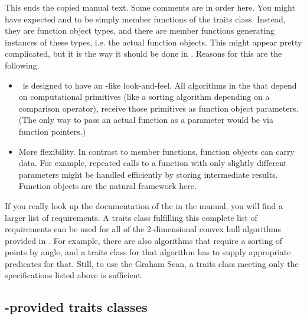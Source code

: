 This ends the copied manual text. 
Some comments are in order here. You might have expected 
and  to be simply member functions of the traits class.
Instead, they are function object types, and there are member 
functions generating instances of these types, i.e. the actual function 
objects. This might appear pretty complicated, but it is the way it should
be done in \cgal. Reasons for this are the following.
\begin{itemize}
\item \cgal\ is designed to have an \stl-like look-and-feel. 
      All algorithms in the \stl that depend on computational
      primitives (like a sorting algorithm depending on a comparison operator),
      receive those primitives as function object parameters. (The only way to
      pass an actual function as a parameter would be via function pointers.)
\item More flexibility. In contrast to member functions, function objects
      can carry data. For example, repeated calls to a function with only
      slightly different parameters might be handled efficiently by storing
      intermediate results. Function objects are the natural framework here.
\end{itemize}

If you really look up the documentation of the 
 in the manual, you will find a larger
list of requirements. 
A traits class fulfilling this complete list of requirements can be used
for all of the 2-dimensional convex hull algorithms provided in \cgal. 
For example, there are also
algorithms that require a sorting of points by angle, and a traits class for
that algorithm has to supply appropriate predicates for that. Still, to use
the Graham Scan, a traits class meeting only the specifications listed above
is sufficient.

\subsection{\cgal-provided traits classes}
\label{subsec:cgal_traits_classes}

